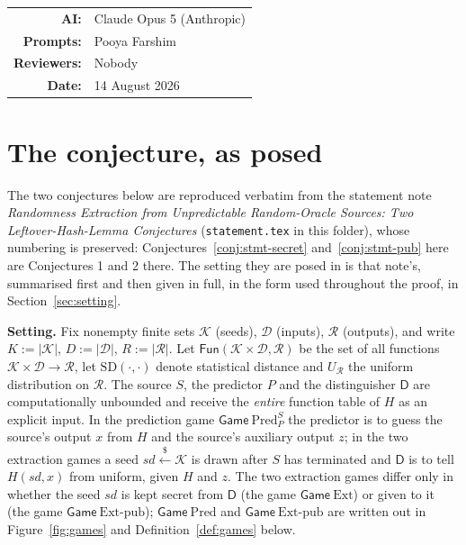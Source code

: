 \documentclass{conjura-solution}
\makeatletter
\newcommand{\Fun}{\mathsf{Fun}}
\newcommand{\Gm}{\mathsf{Game}}
\newcommand{\Pred}{\mathrm{Pred}}
\newcommand{\Ext}{\mathrm{Ext}}
\newcommand{\Extp}{\mathrm{Ext}\text{-}\mathrm{pub}}
\newcommand{\sd}{\mathit{sd}}
\renewcommand{\sample}{\stackrel{{\scriptscriptstyle\$}}{\leftarrow}}
\newcommand{\SD}{\mathrm{SD}}
\newcommand{\calK}{\mathcal{K}}
\newcommand{\calD}{\mathcal{D}}
\newcommand{\calR}{\mathcal{R}}
\newcommand{\AIModelsUsed}{Claude Opus 5 (Anthropic)}
\newcommand{\PromptedBy}{Pooya Farshim}
\newcommand{\ReviewedBy}{Nobody}
\newcommand{\PaperDate}{14 August 2026}
\newcommand{\AIDisclosure}{%
  \begingroup
  \small\centering
  \begin{tabular}{@{}rl@{}}
    \textbf{AI:} & \AIModelsUsed \\
    \textbf{Prompts:} & \PromptedBy \\
    \textbf{Reviewers:} & \ReviewedBy \\
    \textbf{Date:} & \PaperDate \\
  \end{tabular}
  \par
  \endgroup
}
\makeatother
\begin{document}

\vspace{0.6em}
\AIDisclosure

\vspace{1em}

\section*{The conjecture, as posed}\label{sec:posed}

The two conjectures below are reproduced verbatim from the statement note
\emph{Randomness Extraction from Unpredictable Random-Oracle Sources: Two
Leftover-Hash-Lemma Conjectures} (\texttt{statement.tex} in this folder), whose numbering is
preserved: Conjectures~\ref{conj:stmt-secret} and~\ref{conj:stmt-pub} here are Conjectures 1
and 2 there. The setting they are posed in is that note's, summarised first and then given in
full, in the form used throughout the proof, in Section~\ref{sec:setting}.

\medskip
\noindent\textbf{Setting.}
Fix nonempty finite sets $\calK$ (seeds), $\calD$ (inputs), $\calR$ (outputs), and write
$K := |\calK|$, $D := |\calD|$, $R := |\calR|$. Let $\Fun(\calK \times \calD, \calR)$ be the set of
all functions $\calK \times \calD \to \calR$, let $\SD(\cdot,\cdot)$ denote statistical distance and
$U_{\calR}$ the uniform distribution on $\calR$. The source $S$, the predictor $P$ and the
distinguisher $\mathsf{D}$ are computationally unbounded and receive the \emph{entire} function
table of $H$ as an explicit input. In the prediction game $\Gm\ \Pred^{S}_{P}$ the predictor is
to guess the source's output $x$ from $H$ and the source's auxiliary output $z$; in the two
extraction games a seed $\sd \sample \calK$ is drawn after $S$ has terminated and $\mathsf{D}$ is
to tell $H(\sd,x)$ from uniform, given $H$ and $z$. The two extraction games differ only in
whether the seed $\sd$ is kept secret from $\mathsf{D}$ (the game $\Gm\ \Ext$) or given to it
(the game $\Gm\ \Extp$); $\Gm\ \Pred$ and $\Gm\ \Extp$ are written out in
Figure~\ref{fig:games} and Definition~\ref{def:games} below.
\end{document}
